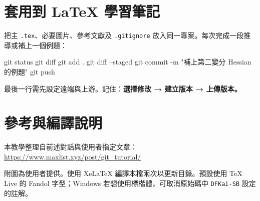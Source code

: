 \documentclass[UTF8,fontset=fandol,11pt,a4paper]{ctexart}
\begin{document}
\section{套用到 LaTeX 學習筆記}
把主 \texttt{.tex}、必要圖片、參考文獻及 \texttt{.gitignore} 放入同一專案。每次完成一段推導或補上一個例題：
\begin{code}
    git status
    git diff
    git add .
    git diff --staged
    git commit -m "補上第二變分 Hessian 的例題"
    git push
\end{code}
最後一行需先設定遠端與上游。記住：\textbf{選擇修改 → 建立版本 → 上傳版本。}
\section*{參考與編譯說明}
本教學整理自前述對話與使用者指定文章：\\
\url{https://www.maxlist.xyz/post/git_tutorial/}

附圖為使用者提供。使用 XeLaTeX 編譯本檔兩次以更新目錄。預設使用 TeX Live 的 Fandol 字型；Windows 若想使用標楷體，可取消原始碼中 \texttt{DFKai-SB} 設定的註解。
\end{document}
